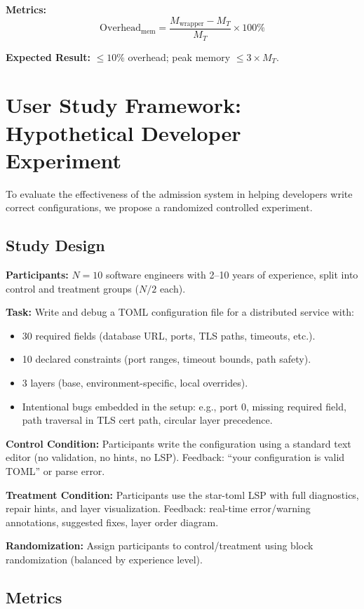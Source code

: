 \textbf{Metrics:}
\[
  \mathrm{Overhead}_{\mathrm{mem}} = \frac{M_{\mathrm{wrapper}} - M_T}{M_T} \times 100\%
\]

\textbf{Expected Result:} $\leq 10\%$ overhead; peak memory $\leq 3 \times M_T$.

\section{User Study Framework: Hypothetical Developer Experiment}

To evaluate the effectiveness of the admission system in helping developers
write correct configurations, we propose a randomized controlled experiment.

\subsection{Study Design}

\textbf{Participants:} $N = 10$ software engineers with 2--10 years of experience,
split into control and treatment groups ($N/2$ each).

\textbf{Task:} Write and debug a TOML configuration file for a distributed
service with:
\begin{itemize}
  \item 30 required fields (database URL, ports, TLS paths, timeouts, etc.).
  \item 10 declared constraints (port ranges, timeout bounds, path safety).
  \item 3 layers (base, environment-specific, local overrides).
  \item Intentional bugs embedded in the setup: e.g., port 0, missing required field,
        path traversal in TLS cert path, circular layer precedence.
\end{itemize}

\textbf{Control Condition:} Participants write the configuration using
a standard text editor (no validation, no hints, no LSP).
Feedback: ``your configuration is valid TOML'' or parse error.

\textbf{Treatment Condition:} Participants use the star-toml LSP with
full diagnostics, repair hints, and layer visualization.
Feedback: real-time error/warning annotations, suggested fixes,
layer order diagram.

\textbf{Randomization:} Assign participants to control/treatment using
block randomization (balanced by experience level).

\subsection{Metrics}

